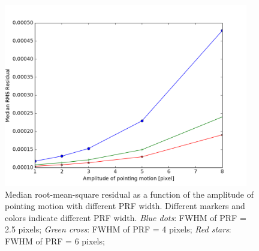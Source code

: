 \documentclass[12pt, preprint]{aastex}
\begin{document}
\begin{figure}[p]
\begin{center}
\includegraphics[width=0.95\textwidth]{motion}
\end{center}
\caption{
\label{motion_rms}
 Median root-mean-square residual as a function of the amplitude of pointing motion with different PRF width.
 Different markers and colors indicate different PRF width.
 \emph{Blue dots}: FWHM of PRF = 2.5 pixels;
 \emph{Green cross}: FWHM of PRF = 4 pixels;
 \emph{Red stars}: FWHM of PRF = 6 pixels;
}
\end{figure}
\end{document}
